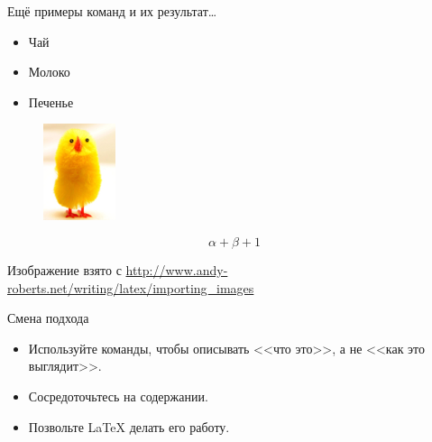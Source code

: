 \documentclass{beamer}
\begin{document}
\begin{frame}[fragile]{Ещё примеры команд и их результат\ldots}
\vspace{-0.5mm}
\begin{exampletwoup}
\begin{itemize}
\item Чай
\item Молоко
\item Печенье
\end{itemize}
\end{exampletwoup}
\vspace{-0.5mm}
\begin{exampletwoup}
\begin{figure}
\includegraphics{chick}
\end{figure}
\end{exampletwoup}
\vspace{-0.5mm}
\begin{exampletwoup}
\begin{equation}
\alpha + \beta + 1
\end{equation}
\end{exampletwoup}
\vspace{-3mm}
\tiny{Изображение взято с \url{http://www.andy-roberts.net/writing/latex/importing_images}}
\end{frame}

\begin{frame}[fragile]{Смена подхода}

\begin{itemize}
\item Используйте команды, чтобы описывать <<что это>>, а не <<как это выглядит>>.
\item Сосредоточьтесь на содержании.
\item Позвольте \LaTeX{} делать его работу.
\end{itemize}
\end{frame}
\end{document}
